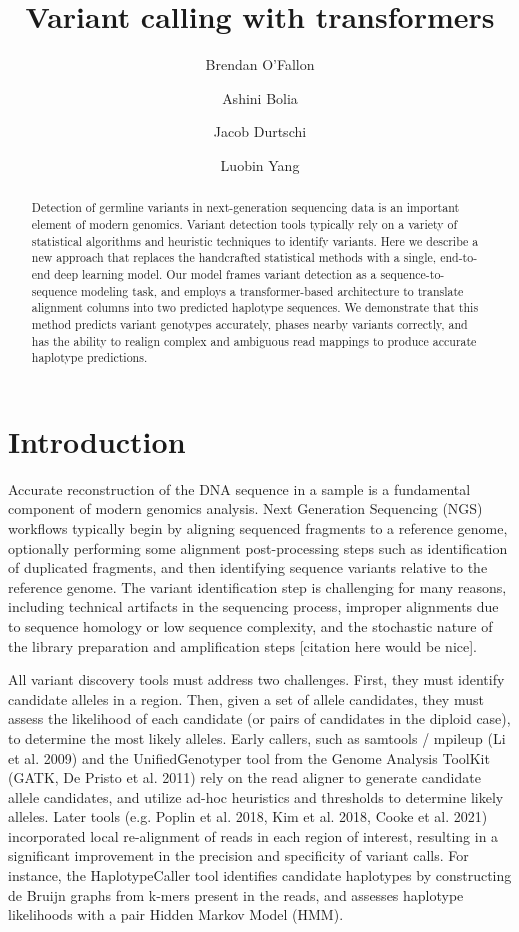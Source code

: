 \documentclass[]{article}
\title{Variant calling with transformers}
\author[1]{Brendan O'Fallon}
\author[1]{Ashini Bolia}
\author[1]{Jacob Durtschi}
\author[1]{Luobin Yang}
\affil[1]{ARUP Institute for Clinical and Experimental Pathology, Salt Lake City, UT}
\date{}
\begin{document}
\maketitle

\begin{abstract}
	Detection of germline variants in next-generation sequencing data is an important element of modern genomics. Variant detection tools typically rely on a variety of statistical algorithms and heuristic techniques to identify variants. Here we describe a new approach that replaces the handcrafted statistical methods with a single, end-to-end deep learning model. Our model frames variant detection as a sequence-to-sequence modeling task, and employs a transformer-based architecture to translate alignment columns into two predicted haplotype sequences. We demonstrate that this method predicts variant genotypes accurately, phases nearby variants correctly, and has the ability to realign complex and ambiguous read mappings to produce accurate haplotype predictions. 

\end{abstract}



\section{Introduction}

Accurate reconstruction of the DNA sequence in a sample is a fundamental component of modern genomics analysis. Next Generation Sequencing (NGS) workflows typically begin by aligning sequenced fragments to a reference genome, optionally performing some alignment post-processing steps such as identification of duplicated fragments, and then identifying sequence variants relative to the reference genome. The variant identification step is challenging for many reasons, including technical artifacts in the sequencing process, improper alignments due to sequence homology or low sequence complexity, and the stochastic nature of the library preparation and amplification steps [citation here would be nice]. 

All variant discovery tools must address two challenges. First, they must identify candidate alleles in a region. Then, given a set of allele candidates, they must assess the likelihood of each candidate (or pairs of candidates in the diploid case), to determine the most likely alleles. Early callers, such as samtools / mpileup (Li et al. 2009) and the UnifiedGenotyper tool from the Genome Analysis ToolKit (GATK, De Pristo et al. 2011) rely on the read aligner to generate candidate allele candidates, and utilize ad-hoc heuristics and thresholds to determine likely alleles. Later tools (e.g. Poplin et al. 2018, Kim et al. 2018, Cooke et al. 2021) incorporated local re-alignment of reads in each region of interest, resulting in a significant improvement in the precision and specificity of variant calls. For instance, the HaplotypeCaller tool identifies candidate haplotypes by constructing de Bruijn graphs from k-mers present in the reads, and assesses haplotype likelihoods with a pair Hidden Markov Model (HMM). 
\end{document}
